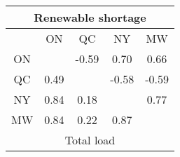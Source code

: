 \begin{tabular}{ccccc}
\multicolumn{5}{c}{Renewable shortage} \\
\midrule
  & ON & QC & NY & MW \\
ON &   & -0.59 & 0.70 & 0.66 \\
QC & 0.49 &   & -0.58 & -0.59 \\
NY & 0.84 & 0.18 &   & 0.77 \\
MW & 0.84 & 0.22 & 0.87 &  \\
\midrule
\multicolumn{5}{c}{Total load} \\
\end{tabular}%
